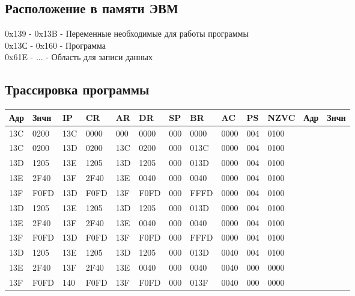 \documentclass[14pt]{extreport}
\begin{document}
    \section{Расположение в памяти ЭВМ}
        0x139 - 0x13B - Переменные необходимые для работы программы \\

        0x13С - 0x160 - Программа \\

        0x61E - ...   - Область для записи данных \\



        \begin{landscape}
            \chapter{Трассировка программы}
            \centering
                \begin{tabular}{|l|l|l|l|l|l|l|l|l|l|l|l|l|}
                    \hline
                    Адр & Знчн & IP & CR & AR & DR & SP & BR & AC & PS & NZVC & Адр & Знчн \\
                    \hline
                    13C & 0200 & 13C & 0000 & 000 & 0000 & 000 & 0000 & 0000 & 004 & 0100 &&\\
                    13C & 0200 & 13D & 0200 & 13C & 0200 & 000 & 013C & 0000 & 004 & 0100 &&\\
                    13D & 1205 & 13E & 1205 & 13D & 1205 & 000 & 013D & 0000 & 004 & 0100 &&\\
                    13E & 2F40 & 13F & 2F40 & 13E & 0040 & 000 & 0040 & 0000 & 004 & 0100 &&\\
                    13F & F0FD & 13D & F0FD & 13F & F0FD & 000 & FFFD & 0000 & 004 & 0100 &&\\
                    13D & 1205 & 13E & 1205 & 13D & 1205 & 000 & 013D & 0000 & 004 & 0100 &&\\
                    13E & 2F40 & 13F & 2F40 & 13E & 0040 & 000 & 0040 & 0000 & 004 & 0100 &&\\
                    13F & F0FD & 13D & F0FD & 13F & F0FD & 000 & FFFD & 0000 & 004 & 0100 &&\\
                    13D & 1205 & 13E & 1205 & 13D & 1205 & 000 & 013D & 0040 & 004 & 0100 &&\\
                    13E & 2F40 & 13F & 2F40 & 13E & 0040 & 000 & 0040 & 0040 & 000 & 0000 &&\\
                    13F & F0FD & 140 & F0FD & 13F & F0FD & 000 & 013F & 0040 & 000 & 0000 &&\\

\end{tabular}
\end{landscape}
\end{document}
